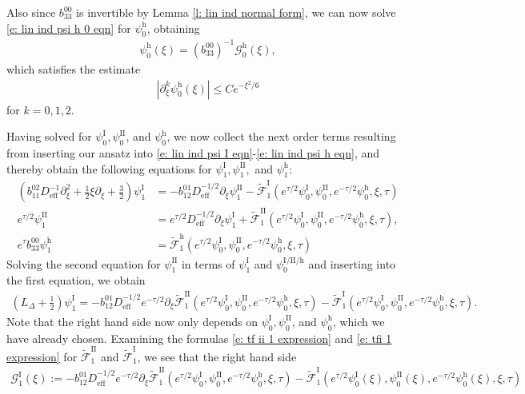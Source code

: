 \documentclass[11pt]{article}
\numberwithin{equation}{section}
\numberwithin{prop}{section}
\newcommand{\psih}{\psi^\mathrm{h}}
\newcommand{\Deff}{D_\mathrm{eff}}
\newcommand{\GI}{\mathcal{G}^\mathrm{I}}
\newcommand{\Gh}{\mathcal{G}^\mathrm{h}}
\newcommand{\tfi}{\tilde{\mathcal{F}}^\mathrm{I}}
\newcommand{\tfii}{\tilde{\mathcal{F}}^\mathrm{II}}
\newcommand{\tfh}{\tilde{\mathcal{F}}^\mathrm{h}}
\newcommand{\psiI}{\psi^\mathrm{I}}
\newcommand{\psiII}{\psi^\mathrm{II}}
\begin{document}
Also since $b_{33}^{00}$ is invertible by Lemma \ref{l: lin ind normal form}, we can now solve \eqref{e: lin ind psi h 0 eqn} for $\psih_0$, obtaining 
\begin{align}
\psih_0 (\xi) = (b_{33}^{00})^{-1} \Gh_0 (\xi),
\end{align}
which satisfies the estimate
\begin{align}
| \partial_\xi^k \psih_0(\xi) | \leq C e^{-\xi^2/6} \label{e: lin ind psi h 0 estimate}
\end{align}
for $k = 0, 1, 2$. 

Having solved for $\psiI_0, \psiII_0$, and $\psih_0$, we now collect the next order terms resulting from inserting our ansatz into \eqref{e: lin ind psi I eqn}-\eqref{e: lin ind psi h eqn}, and thereby obtain the following equations for $\psiI_1, \psiII_1,$ and $\psih_1$: 
\begin{align}
\left(b_{11}^{02} \Deff^{-1} \partial_\xi^2 + \frac{1}{2} \xi \partial_\xi + \frac{3}{2} \right) \psiI_1 &= -b_{12}^{01}  \Deff^{-1/2} \partial_\xi \psiII_1  - \tfi_1 \left(e^{\tau/2 }\psiI_0, \psiII_0,  e^{-\tau/2} \psih_0, \xi, \tau \right) \label{e: lin ind psi I 1 eqn} \\
e^{\tau/2} \psiII_1 &= e^{\tau/2} \Deff^{-1/2} \partial_\xi \psiI_1 + \tfii_1 \left( e^{\tau/2 }\psiI_0, \psiII_0,  e^{-\tau/2} \psih_0, \xi, \tau \right), \\
e^\tau b_{33}^{00} \psih_1 &= \tfh_1 \left( e^{\tau/2 }\psiI_0, \psiII_0,  e^{-\tau/2} \psih_0, \xi, \tau \right) \label{e: lin ind psi h 1 eqn}
\end{align}
Solving the second equation for $\psiII_1$ in terms of $\psiI_1$ and $\psi^{\mathrm{I}/\mathrm{II}/\mathrm{h}}_0$ and inserting into the first equation, we obtain 
\begin{align}
\left( L_\Delta + \frac{1}{2} \right) \psiI_1 = - b_{12}^{01} \Deff^{-1/2} e^{-\tau/2} \partial_\xi \tfii_1 \left( e^{\tau/2 }\psiI_0, \psiII_0,  e^{-\tau/2} \psih_0, \xi, \tau \right) - \tfi_1 \left(e^{\tau/2 }\psiI_0, \psiII_0,  e^{-\tau/2} \psih_0, \xi, \tau \right). \label{e: lin ind psiI 1 eqn}
\end{align}
Note that the right hand side now only depends on $\psiI_0, \psiII_0$, and $\psih_0$, which we have already chosen. Examining the formulas \eqref{e: tf ii 1 expression} and \eqref{e: tfi 1 expression} for $\tfii_1$ and $\tfi_1$, we see that the right hand side
\begin{align}
\GI_1 (\xi) := - b_{12}^{01} \Deff^{-1/2} e^{-\tau/2} \partial_\xi \tfii_1 \left( e^{\tau/2 }\psiI_0, \psiII_0,  e^{-\tau/2} \psih_0, \xi, \tau \right) - \tfi_1 \left(e^{\tau/2 }\psiI_0 (\xi), \psiII_0 (\xi),  e^{-\tau/2} \psih_0 (\xi), \xi, \tau \right)
\end{align}
\end{document}
